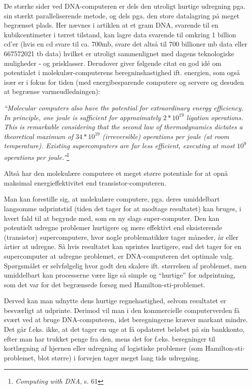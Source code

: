 \documentclass[10pt,a4paper]{article}
\newcommand{\citat}[2]{\begin{justify}\textit{``#1''}\hspace{0.1cm}\footnote{#2}\end{justify}}
\begin{document}
De stærke sider ved DNA-computeren er dels den utroligt hurtige udregning pga. 
sin stærkt paralleliserende metode, og dels pga. den store datalagring på meget 
begrænset plads. Her nævnes i artiklen at et gram DNA, svarende til en 
kubikcentimeter i tørret tilstand, kan lagre data svarende til omkring 1
billion cd'er (hvis en cd svare til ca. 700mb, svare det altså til 700 billioner
mb data eller 667572021 tb data) hvilket er utroligt sammenlignet med dagens
teknologiske muligheder - og prisklasser. Derudover giver følgende citat en god 
idé om potentialet i molekulær-computerens beregninshastighed ift. energien, 
som også især er i fokus for tiden (med energibesparende computere og servere 
og desuden at begrænse varmeudledningen):
\citat{Molecular computers also have the potential for extraordinary energy 
efficiency. In principle, one joule is sufficient for approximately $2*10^{19}$ 
ligation operations. This is remarkable considering that the second law of 
thermodynamics dictates a theoretical maximum of $34*10^{19}$ (irreversible) 
operations per joule (at room temperature). Existing supercomputers are far
less efficient, executing at most $10^{9}$ operations per
joule.}{\textit{Computing with DNA}, s. 61}

Altså har den molekulære computere et meget større potentiale for at opnå 
maksimal energieffektivitet end transistor-computeren.

Man kan forestille sig, at molekulære computere, pga. deres umiddelbart 
langsomme udprintstid (tiden det tager for at modtage resultatet) kan bruges, i 
hvert fald til at begynde med, som en ny slags super-computer. Den kan 
potentielt udregne problemer hurtigere og mere effektivt end eksisterende
(transistor) supercomputere, hvor nogle problematikker tager måneder, år eller
årtier at udregne. Så hvis resultatet kan uprintes hurtigere, end det tager for
en supercomputer at udregne problemet, er DNA-computeren det optimale valg.
Spørgsmålet er selvfølgelig hvor godt den skalere ift. størrelsen af problemet,
men umiddelbart kan processerne være lige så simple og ``hurtige'' for
udprintning, som det var for det begrænsede forsøg med Hamilton-sti-problemet.

Derved kan man udnytte dens hurtige regnehastighed, selvom resultatet er
besværligt at udprinte. Derimod vil man i den kommercielle computerverden få
svært ved at bruge DNA-computeren, idet beregningerne kræver markant mindre. Det
går f.eks. ikke, at det tager en uge at få opdateret beløbet på sin bankkonto,
efter man har trukket penge fra den, mens det for f.eks. beregninger til
kortlægning af hjernen eller udregning af logistiske problemer (som
Hamilton-sti-problemet, blot større) i forvejen tager meget lang tids udregning.
\end{document}
